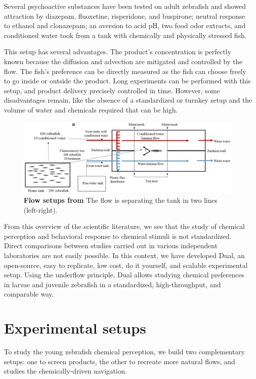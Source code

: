     Several psychoactive substances have been tested on adult zebrafish \cite{abreu2016acute, abreu2016behavioral} and showed attraction by diazepam, fluoxetine, risperidone, and buspirone; neutral response to ethanol and clonazepam; an aversion to acid pH, two food odor extracts, and conditioned water took from a tank with chemically and physically stressed fish.

    This setup has several advantages. The product's concentration is perfectly known because the diffusion and advection are mitigated and controlled by the flow. The fish's preference can be directly measured as the fish can choose freely to go inside or outside the product. Long experiments can be performed with this setup, and product delivery precisely controlled in time. However, some disadvantages remain, like the absence of a standardized or turnkey setup and the volume of water and chemicals required that can be high.

    \begin{figure}[h]
      \centering
      \includegraphics[width=1\textwidth]{part_2/assets/flow_0.png}
      \caption{\textbf{Flow setups from \cite{abreu2016behavioral}} The flow is separating the tank in two lines (left-right).}
      \label{flow_0_setup}
    \end{figure}

    From this overview of the scientific literature, we see that the study of chemical perception and behavioral response to chemical stimuli is not standardized. Direct comparisons between studies carried out in various independent laboratories are not easily possible. In this context, we have developed Dual, an open-source, easy to replicate, low cost, do it yourself, and scalable experimental setup. Using the underflow principle, Dual allows studying chemical preferences in larvae and juvenile zebrafish in a standardized, high-throughput, and comparable way.

\chapter{Experimental setups}
  To study the young zebrafish chemical perception, we build two complementary setups: one to screen products, the other to recreate more natural flows, and studies the chemically-driven navigation.

